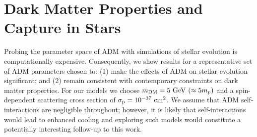 \documentclass[useAMS,usenatbib]{mnras}
\begin{document}
%


\section{Dark Matter Properties and Capture in Stars}
\label{sec:props}

  Probing the parameter space of ADM with simulations of stellar evolution is computationally expensive.
  Consequently, we show results for a representative set of ADM parameters chosen to:
  (1) make the effects of ADM on stellar evolution significant;
  and (2) remain consistent with contemporary constraints on dark matter properties.
  For our models we choose $m_{\mathrm{DM}} = 5 \ \mathrm{GeV}\ (\approx 5m_p)$ and a spin-dependent
  scattering cross section of $\sigma_{\mathrm{p}} = 10^{-37} \ \mathrm{cm}^2$.  We assume that ADM self-interactions
  are negligible throughout; however, it is likely that self-interactions would lead to enhanced
  cooling \citep[e.g.,][]{Zentner2009High-energySun} and exploring such models would
  constitute a potentially interesting follow-up to this work.


\end{document}
